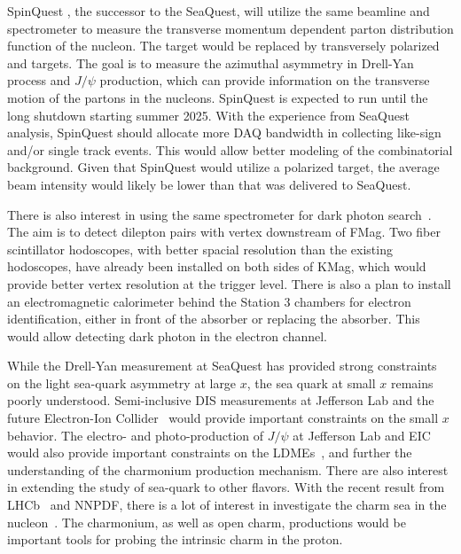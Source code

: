 \documentclass[../main.tex]{subfiles}
\begin{document}
SpinQuest \cite{geesaman2014}, the successor to the SeaQuest, will utilize the same beamline and
spectrometer to measure the transverse momentum dependent parton distribution
function of the nucleon. The target would be replaced by transversely polarized 
and  targets. The goal is to measure the azimuthal asymmetry in
Drell-Yan process and $J/\psi$ production, which can provide information on the
transverse motion of the partons in the nucleons.
SpinQuest is expected to run until the long shutdown starting summer 2025. With the experience
from SeaQuest analysis, SpinQuest should allocate more DAQ bandwidth in collecting
like-sign and/or single track events. This would allow better modeling of the combinatorial
background. Given that SpinQuest would utilize a polarized target,
the average beam intensity would likely be lower than that was delivered to SeaQuest.

There is also interest in using the same spectrometer for dark photon search~\cite{apyan2022}.
The aim is to detect dilepton pairs with vertex downstream of FMag.
Two fiber scintillator hodoscopes, with better spacial resolution than the existing hodoscopes,
have already been installed on both sides of KMag,
which would provide better vertex resolution at the trigger level.
There is also a plan to install an electromagnetic calorimeter behind the
Station 3 chambers for electron identification, either in front of the absorber or replacing the absorber.
This would allow detecting dark photon in the electron channel.

While the Drell-Yan measurement at SeaQuest has provided strong constraints on the light sea-quark
asymmetry at large $x$, the sea quark at small $x$ remains poorly understood.
Semi-inclusive DIS measurements at Jefferson Lab and the future Electron-Ion Collider~\cite{abdulkhalek2022}
would provide important constraints on the small $x$ behavior. 
The electro- and photo-production of $J/\psi$ at Jefferson Lab and EIC would also provide important
constraints on the LDMEs~\cite{qiu2021}, and further the understanding of the charmonium production mechanism.
There are also interest in extending the study of sea-quark to other flavors. 
With the recent result from LHCb~\cite{aaij2022} and NNPDF\cite{ball2022},
there is a lot of interest in investigate the charm sea in the nucleon~\cite{vogt2021,vogt2023}.
The charmonium, as well as open charm, productions would be important tools for probing the intrinsic charm in the proton.

\ifSubfilesClassLoaded{ \printbibliography[heading=bibintoc,title={References}]}{}
\end{document}
